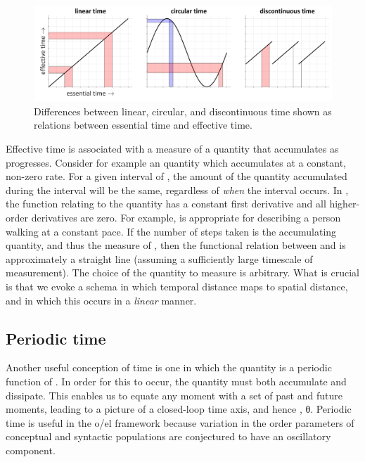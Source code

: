   
\begin{figure}
\includegraphics[width=\textwidth]{figures/Tilsen-img45.png}
\caption{Differences between linear, circular, and discontinuous time shown as relations between essential time and effective time.}
\label{fig:3:17}
\end{figure}
 

  Effective time is associated with a measure of a quantity that accumulates as  progresses. Consider for example an  quantity which accumulates at a constant, non-zero rate. For a given interval of , the amount of the quantity accumulated during the interval will be the same, regardless of \textit{when} the interval occurs. In , the function relating  to the  quantity has a constant first derivative and all higher-order derivatives are zero. For example,  is appropriate for describing a person walking at a constant pace. If the number of steps taken is the accumulating quantity, and thus the measure of , then the functional relation between  and  is approximately a straight line (assuming a sufficiently large timescale of measurement). The choice of the quantity to measure is arbitrary. What is crucial is that we evoke a schema in which temporal distance maps to spatial distance, and in which this occurs in a \textit{linear} manner.

\subsection{Periodic time}

Another useful conception of time is one in which the  quantity is a periodic function of . In order for this to occur, the quantity must both accumulate and dissipate. This enables us to equate any moment with a set of past and future moments, leading to a picture of a closed-loop time axis, and hence , θ. Periodic time is useful in the o/el framework because variation in the order parameters of conceptual and syntactic populations are conjectured to have an oscillatory component.

